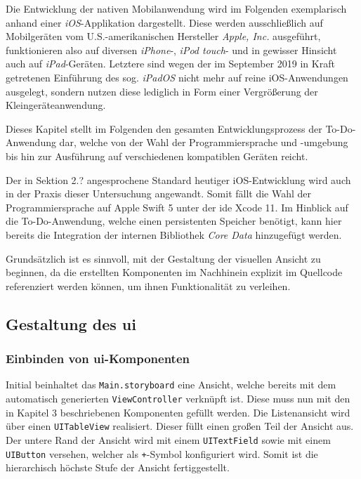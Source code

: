 Die Entwicklung der nativen Mobilanwendung wird im Folgenden exemplarisch anhand einer \textit{iOS}-Applikation dargestellt. Diese werden ausschließlich auf Mobilgeräten vom U.S.-amerikanischen Hersteller \textit{Apple, Inc.} ausgeführt, funktionieren also auf diversen \textit{iPhone}-, \textit{iPod touch}- und in gewisser Hinsicht auch auf \textit{iPad}-Geräten. Letztere sind wegen der im September 2019 in Kraft getretenen Einführung des sog. \textit{iPadOS} nicht mehr auf reine iOS-Anwendungen ausgelegt, sondern nutzen diese lediglich in Form einer Vergrößerung der Kleingeräteanwendung.

Dieses Kapitel stellt im Folgenden den gesamten Entwicklungsprozess der To-Do-Anwendung dar, welche von der Wahl der Programmiersprache und -umgebung bis hin zur Ausführung auf verschiedenen kompatiblen Geräten reicht.

Der in Sektion 2.? angesprochene Standard heutiger iOS-Entwicklung wird auch in der Praxis dieser Untersuchung angewandt. Somit fällt die Wahl der Programmiersprache auf Apple Swift 5 unter der \acs{ide} Xcode 11. Im Hinblick auf die To-Do-Anwendung, welche einen persistenten Speicher benötigt, kann hier bereits die Integration der internen Bibliothek \textit{Core Data} hinzugefügt werden.

Grundsätzlich ist es sinnvoll, mit der Gestaltung der visuellen Ansicht zu beginnen, da die erstellten Komponenten im Nachhinein explizit im Quellcode referenziert werden können, um ihnen Funktionalität zu verleihen.

\subsection{Gestaltung des \acl{ui}}
\subsubsection{Einbinden von \ac{ui}-Komponenten}
Initial beinhaltet das \texttt{Main.storyboard} eine Ansicht, welche bereits mit dem automatisch generierten \texttt{ViewController} verknüpft ist. Diese muss nun mit den in Kapitel 3 beschriebenen Komponenten gefüllt werden. Die Listenansicht wird über einen \texttt{UITableView} realisiert. Dieser füllt einen großen Teil der Ansicht aus. Der untere Rand der Ansicht wird mit einem \texttt{UITextField} sowie mit einem \texttt{UIButton} versehen, welcher als \texttt{+}-Symbol konfiguriert wird. Somit ist die hierarchisch höchste Stufe der Ansicht fertiggestellt.

